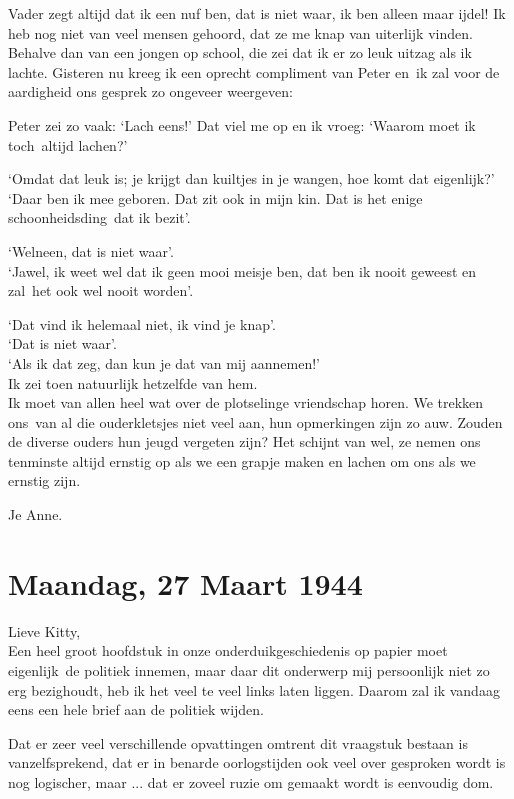 \documentclass{book}
\begin{document}
Vader zegt altijd dat ik een nuf ben, dat is niet waar, ik ben alleen
maar ijdel! Ik heb nog niet van veel mensen gehoord, dat ze me knap van
uiterlijk vinden. Behalve dan van een jongen op school, die zei dat ik
er zo leuk uitzag als ik lachte. Gisteren nu kreeg ik een oprecht
compliment van Peter en~ik zal voor de aardigheid ons gesprek zo
ongeveer weergeven:

Peter zei zo vaak: `Lach eens!' Dat viel me op en ik vroeg: `Waarom moet
ik toch~altijd lachen?'

`Omdat dat leuk is; je krijgt dan kuiltjes in je wangen, hoe komt dat
eigenlijk?' `Daar ben ik mee geboren. Dat zit ook in mijn kin. Dat is
het enige schoonheidsding~dat ik bezit'.

`Welneen, dat is niet waar'.\\`Jawel, ik weet wel dat ik geen mooi
meisje ben, dat ben ik nooit geweest en zal~het ook wel nooit worden'.

`Dat vind ik helemaal niet, ik vind je knap'.\\`Dat is niet waar'.\\`Als
ik dat zeg, dan kun je dat van mij aannemen!'\\Ik zei toen natuurlijk
hetzelfde van hem.\\Ik moet van allen heel wat over de plotselinge
vriendschap horen. We trekken ons~van al die ouderkletsjes niet veel
aan, hun opmerkingen zijn zo auw. Zouden de diverse ouders hun jeugd
vergeten zijn? Het schijnt van wel, ze nemen ons tenminste altijd
ernstig op als we een grapje maken en lachen om ons als we ernstig zijn.

Je Anne.

\chapter{Maandag, 27 Maart 1944}

Lieve Kitty,\\Een heel groot hoofdstuk in onze onderduikgeschiedenis op
papier moet eigenlijk~de politiek innemen, maar daar dit onderwerp mij
persoonlijk niet zo erg bezighoudt, heb ik het veel te veel links laten
liggen. Daarom zal ik vandaag eens een hele brief aan de politiek
wijden.

Dat er zeer veel verschillende opvattingen omtrent dit vraagstuk bestaan
is vanzelfsprekend, dat er in benarde oorlogstijden ook veel over
gesproken wordt is nog logischer, maar ... dat er zoveel ruzie om
gemaakt wordt is eenvoudig dom.
\end{document}
